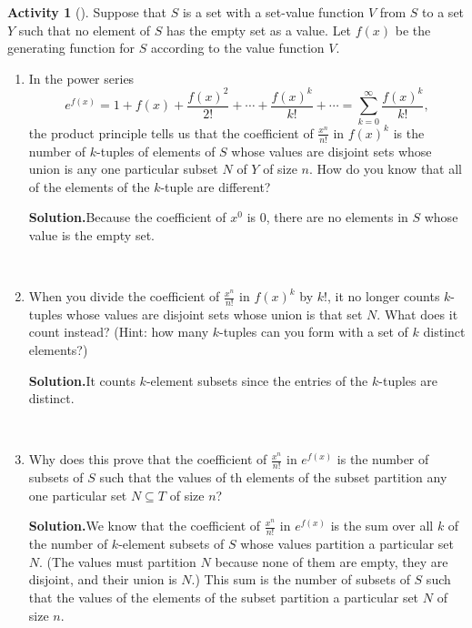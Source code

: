 \documentclass[10pt,]{book}
\theoremstyle{plain}
\theoremstyle{definition}
\newtheorem{activity}[project]{Activity}
\numberwithin{equation}{chapter}
\begin{document}
\begin{activity}[]\label{exponentialformula}
Suppose that \(S\) is a set with a set-value function \(V\) from \(S\) to a set \(Y\) such that no element of \(S\) has the empty set as a value. Let \(f(x)\) be the generating function for \(S\) according to the value function \(V\).%
~\par
\begin{enumerate}[label=(\alph*)]
 \item In the power series%
\begin{equation*}
e^{f(x)} = 1 + f(x) + \frac{f(x)^2}{2!} +
\cdots + \frac{f(x)^k}{k!} + \cdots= \sum_{k=0}^\infty \frac{f(x)^k}{k!},
\end{equation*}
the product principle tells us that the coefficient of \(\frac{x^n}{n!}\) in \(f(x)^k\) is the number of \(k\)-tuples of elements of \(S\) whose values are disjoint sets whose union is any one particular subset \(N\) of \(Y\) of size \(n\).  How do you know that all of the elements of the \(k\)-tuple are different?%
\par\medskip\noindent%
\textbf{Solution.}\quad Because the coefficient of \(x^0\) is 0, there are no elements in \(S\) whose value is the empty set.%

~\par
\item When you divide the coefficient of \(\frac{x^n}{n!}\) in \(f(x)^k\) by \(k!\), it no longer counts \(k\)-tuples whose values are disjoint sets whose union is that set \(N\).  What does it count instead?  (Hint: how many \(k\)-tuples can you form with a set of \(k\) distinct elements?)%
\par\medskip\noindent%
\textbf{Solution.}\quad It counts \(k\)-element subsets since the entries of the \(k\)-tuples are distinct.%

~\par
\item Why does this prove that the coefficient of \(\frac{x^n}{n!}\) in \(e^{f(x)}\) is the number of subsets of \(S\) such that the values of th elements of the subset partition any one particular set \(N\subseteq T\) of size \(n\)?%
\par\medskip\noindent%
\textbf{Solution.}\quad We know that the coefficient of \(\frac{x^n}{n!}\) in \(e^{f(x)}\) is the sum over all \(k\) of the number of \(k\)-element subsets of \(S\) whose values partition a particular set \(N\). (The values must partition \(N\) because none of them are empty, they are disjoint, and their union is \(N\).) This sum is the number of subsets of \(S\) such that the values of the elements of the subset partition a particular set \(N\) of size \(n\).%

\end{enumerate}
\end{activity}
\end{document}
